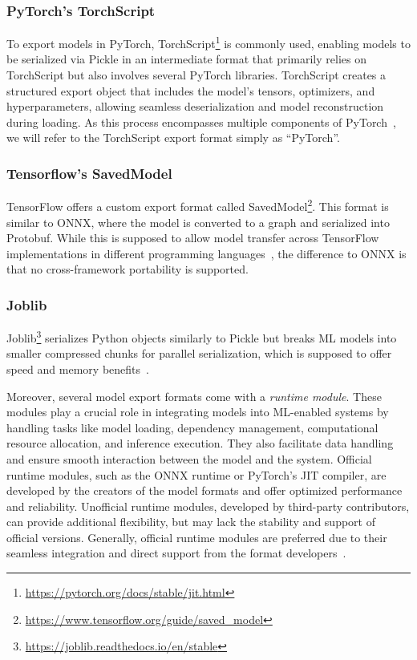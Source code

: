 \subsubsection{PyTorch's TorchScript}
To export models in PyTorch, TorchScript\footnote{\url{https://pytorch.org/docs/stable/jit.html}} is commonly used, enabling models to be serialized via Pickle in an intermediate format that primarily relies on TorchScript but also involves several PyTorch libraries. TorchScript creates a structured export object that includes the model's tensors, optimizers, and hyperparameters, allowing seamless deserialization and model reconstruction during loading. As this process encompasses multiple components of PyTorch~\cite{pytorch2023saving}, we will refer to the TorchScript export format simply as \enquote{PyTorch}.

\subsubsection{Tensorflow's SavedModel}
TensorFlow offers a custom export format called SavedModel\footnote{\url{https://www.tensorflow.org/guide/saved_model}}.
This format is similar to ONNX, where the model is converted to a graph and serialized into Protobuf.
While this is supposed to allow model transfer across TensorFlow implementations in different programming languages~\cite{tensorflow2023savedmodel}, the difference to ONNX is that no cross-framework portability is supported.

\subsubsection{Joblib}
Joblib\footnote{\url{https://joblib.readthedocs.io/en/stable}} serializes Python objects similarly to Pickle but breaks ML models into smaller compressed chunks for parallel serialization, which is supposed to offer speed and memory benefits~\cite{joblib2023github}.

Moreover, several model export formats come with a \textit{runtime module}.
These modules play a crucial role in integrating models into ML-enabled systems by handling tasks like model loading, dependency management, computational resource allocation, and inference execution.
They also facilitate data handling and ensure smooth interaction between the model and the system.
Official runtime modules, such as the ONNX runtime or PyTorch's JIT compiler, are developed by the creators of the model formats and offer optimized performance and reliability.
Unofficial runtime modules, developed by third-party contributors, can provide additional flexibility, but may lack the stability and support of official versions.
Generally, official runtime modules are preferred due to their seamless integration and direct support from the format developers~\cite{saturn2023exporting}.

